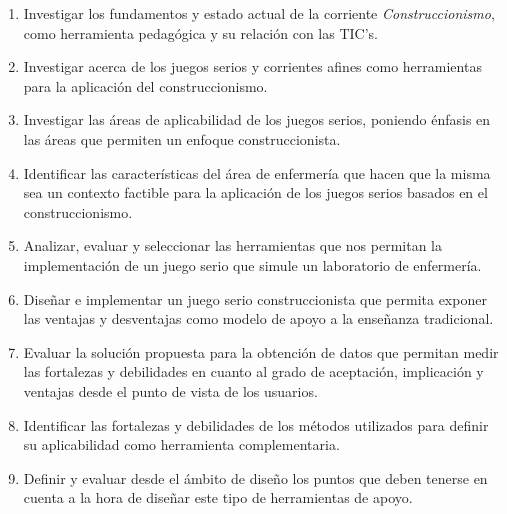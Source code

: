 \begin{enumerate}
    \item Investigar los fundamentos y estado actual de la corriente
        \emph{Construccionismo}, como herramienta pedagógica y su relación con
        las TIC's.

    \item Investigar acerca de los juegos serios y corrientes afines como
        herramientas para la aplicación del construccionismo.
    
    \item Investigar las áreas de aplicabilidad de los juegos serios, poniendo
        énfasis en las áreas que permiten un enfoque construccionista.
        
    \item Identificar las características del área de enfermería que hacen que
        la misma sea un contexto factible para la aplicación de los juegos
        serios basados en el construccionismo.
    
    \item Analizar, evaluar y seleccionar las herramientas que nos permitan la
        implementación de un juego serio que simule un laboratorio de
        enfermería.
        
    \item Diseñar e implementar un juego serio construccionista que permita
        exponer las ventajas y desventajas como modelo de apoyo a la enseñanza
        tradicional. 

    
    \item Evaluar la solución propuesta para la obtención de datos que permitan
        medir las fortalezas y debilidades en cuanto al grado de aceptación,
        implicación y ventajas desde el punto de vista de los usuarios.

    \item Identificar las fortalezas y debilidades de los métodos utilizados
        para definir su aplicabilidad como herramienta complementaria. 

    \item Definir y evaluar desde el ámbito de diseño los puntos que deben
        tenerse en cuenta a la hora de diseñar este tipo de herramientas de
        apoyo.

\end{enumerate}


